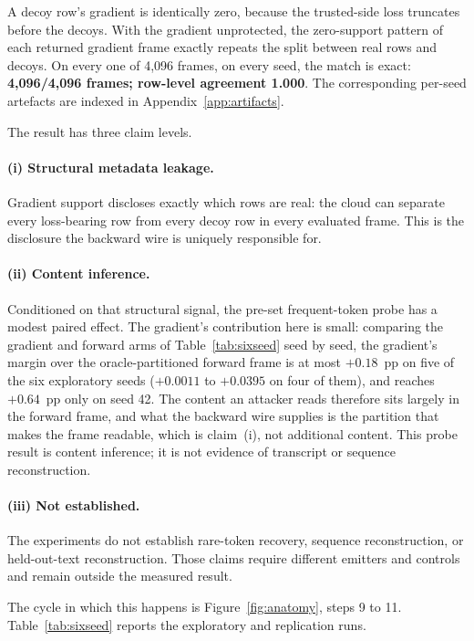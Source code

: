 \documentclass[11pt]{article}
\newcommand{\pp}{pp}
\begin{document}
A decoy row's gradient is identically zero, because the trusted-side loss
truncates before the decoys. With the gradient unprotected, the zero-support
pattern of each returned gradient frame exactly repeats the split between
real rows and decoys. On every one of 4,096 frames, on every seed, the match is exact:
\textbf{4,096/4,096 frames; row-level agreement 1.000}. The corresponding
per-seed artefacts are indexed in Appendix~\ref{app:artifacts}.

The result has three claim levels.
\paragraph{(i) Structural metadata leakage.}
Gradient support discloses exactly which rows are real: the cloud can
separate every loss-bearing row from every decoy row in every evaluated frame.
This is the disclosure the backward wire is uniquely responsible for.
\paragraph{(ii) Content inference.}
Conditioned on that structural signal, the pre-set frequent-token probe has a
modest paired effect. The gradient's contribution here is small: comparing the
gradient and forward arms of Table~\ref{tab:sixseed} seed by seed, the
gradient's margin over the oracle-partitioned forward frame is at most
$+0.18$~\pp{} on five of the six exploratory seeds ($+0.0011$ to $+0.0395$
on four of them), and reaches $+0.64$~\pp{} only on seed 42. The content an attacker reads therefore sits largely in the
forward frame, and what the backward wire supplies is the partition that makes
the frame readable, which is claim~(i), not additional content. This probe
result is content inference; it is not evidence of transcript or sequence
reconstruction.
\paragraph{(iii) Not established.}
The experiments do not establish rare-token recovery, sequence reconstruction,
or held-out-text reconstruction. Those claims require different emitters and
controls and remain outside the measured result.

The cycle in which this happens is Figure~\ref{fig:anatomy}, steps 9 to 11.
Table~\ref{tab:sixseed} reports the exploratory and replication runs.
\end{document}
